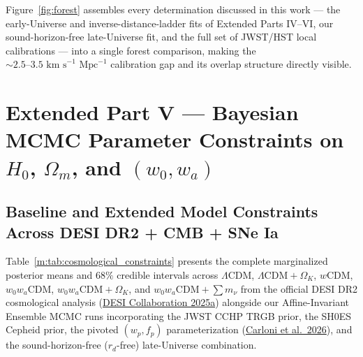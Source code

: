 \documentclass[aps,prd,preprint,superscriptaddress,nofootinbib]{revtex4-2}
\begin{document}
Figure~\ref{fig:forest} assembles every determination discussed in this work --- the early-Universe and inverse-distance-ladder fits of Extended Parts IV--VI, our sound-horizon-free late-Universe fit, and the full set of JWST/HST local calibrations --- into a single forest comparison, making the $\sim 2.5\text{--}3.5\text{ km s}^{-1}\text{ Mpc}^{-1}$ calibration gap and its overlap structure directly visible.



\section{Extended Part V --- Bayesian MCMC Parameter Constraints on $H_0$, $\Omega_m$, and $(w_0, w_a)$}

\subsection{Baseline and Extended Model Constraints Across DESI DR2 + CMB + SNe Ia}

Table~\ref{m:tab:cosmological_constraints} presents the complete marginalized posterior means and $68\%$ credible intervals across $\Lambda$CDM, $\Lambda\text{CDM}+\Omega_K$, $w$CDM, $w_0 w_a$CDM, $w_0 w_a\text{CDM}+\Omega_K$, and $w_0 w_a\text{CDM}+\sum m_\nu$ from the official DESI DR2 cosmological analysis (\href{https://arxiv.org/abs/2503.14738}{DESI Collaboration 2025a}) alongside our Affine-Invariant Ensemble MCMC runs incorporating the JWST CCHP TRGB prior, the SH0ES Cepheid prior, the pivoted $(w_p, f_p)$ parameterization (\href{https://arxiv.org/pdf/2608.01215}{Carloni et al.\ 2026}), and the sound-horizon-free ($r_d$-free) late-Universe combination.
\end{document}
